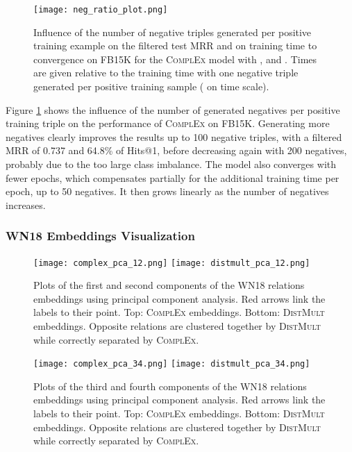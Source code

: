 \documentclass[twoside,11pt]{article}
\begin{document}
\begin{figure}[t]
	\centering
	\texttt{[image: neg\_ratio\_plot.png]}
	
    \caption{Influence of the number of negative triples generated per positive training example on the filtered test MRR and on training time to convergence on FB15K for the \textsc{ComplEx} model with ,  and . Times are given relative to the training time with one negative triple generated per positive training sample ( on time scale).}
	\label{fig:neg_ratio}
	
\end{figure}


Figure \ref{fig:neg_ratio} shows the influence of the number of generated negatives per positive training triple on the performance of \textsc{ComplEx} on FB15K.
Generating more negatives clearly improves the results up to 100 negative triples, with a filtered MRR of 0.737 and 64.8\% of Hits@1, before decreasing again with 200 negatives, probably due to the too large class imbalance. The model also converges with fewer epochs, which compensates partially for the additional training time per epoch, up to 50 negatives. It then grows linearly as the number of negatives increases.




\subsubsection{WN18 Embeddings Visualization}
\label{app:wn18_pca}


\begin{figure*}[!ht]\centering
	\texttt{[image: complex\_pca\_12.png]}
	\texttt{[image: distmult\_pca\_12.png]}
	\vspace{-5mm}
	\caption{Plots of the first and second  components of the WN18 relations embeddings using principal component analysis. Red arrows link the labels to their point. Top: \textsc{ComplEx} embeddings. Bottom: \textsc{DistMult} embeddings. Opposite relations are clustered together by \textsc{DistMult} while correctly separated by \textsc{ComplEx}.}
	\label{fig:pca12}
\end{figure*}


\begin{figure*}[!ht]\centering
	\texttt{[image: complex\_pca\_34.png]}
	\texttt{[image: distmult\_pca\_34.png]}
	\vspace{-5mm}
	\caption{Plots of the third and fourth components of the WN18 relations embeddings using principal component analysis. Red arrows link the labels to their point. Top: \textsc{ComplEx} embeddings. Bottom: \textsc{DistMult} embeddings. Opposite relations are clustered together by \textsc{DistMult} while correctly separated by \textsc{ComplEx}.}
	\label{fig:pca34}
\end{figure*}
\end{document}
